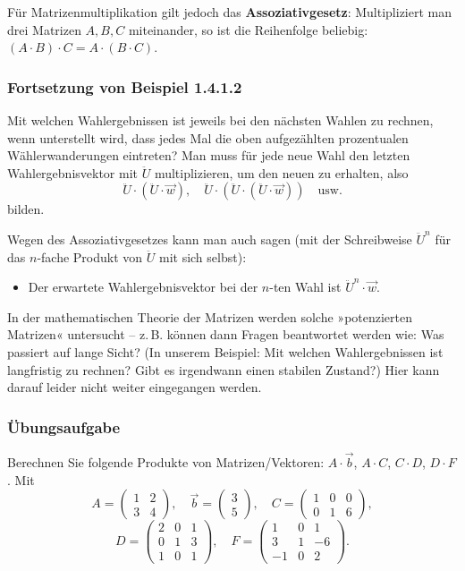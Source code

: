 Für Matrizenmultiplikation gilt jedoch das \textbf{Assoziativgesetz}: Multipliziert man drei Matrizen $A, B, C$ miteinander, so ist die Reihenfolge beliebig: $(A \cdot B) \cdot C = A \cdot (B \cdot C)$.

\subsubsection{Fortsetzung von Beispiel 1.4.1.2}

Mit welchen Wahlergebnissen ist jeweils bei den nächsten Wahlen zu rechnen, wenn unterstellt wird, dass jedes Mal die oben aufgezählten prozentualen Wählerwanderungen eintreten? Man muss für jede neue Wahl den letzten Wahlergebnisvektor mit $\ddot{U}$ multiplizieren, um den neuen zu erhalten, also
\[ \ddot{U} \cdot (\ddot{U} \cdot \vec{w}) , \quad \ddot{U} \cdot (\ddot{U} \cdot (\ddot{U} \cdot \vec{w})) \quad \text{usw.} \]
bilden.

Wegen des Assoziativgesetzes kann man auch sagen (mit der Schreibweise $\ddot{U}^n$ für das $n$-fache Produkt von $\ddot{U}$ mit sich selbst):
\begin{itemize}
  \item Der erwartete Wahlergebnisvektor bei der $n$-ten Wahl ist $\ddot{U}^n \cdot \vec{w}$.
\end{itemize}
In der mathematischen Theorie der Matrizen werden solche »potenzierten Matrizen« untersucht -- z.\,B. können dann Fragen beantwortet werden wie: Was passiert auf lange Sicht? (In unserem Beispiel: Mit welchen Wahlergebnissen ist langfristig zu rechnen? Gibt es irgendwann einen stabilen Zustand?) Hier kann darauf leider nicht weiter eingegangen werden.

\subsubsection{Übungsaufgabe}

\begin{graukasten}
  Berechnen Sie folgende Produkte von Matrizen/Vektoren: $A \cdot \vec{b}$, $A \cdot C$, $C \cdot D$, $D \cdot F$. Mit
  \[ A = \begin{pmatrix} 1 & 2 \\ 3 & 4 \end{pmatrix}, \quad \vec{b} = \begin{pmatrix} 3 \\ 5 \end{pmatrix}, \quad C = \begin{pmatrix} 1 & 0 & 0 \\ 0 & 1 & 6 \end{pmatrix}, \]
  \[ D = \begin{pmatrix} 2 & 0 & 1 \\ 0 & 1 & 3 \\ 1 & 0 & 1 \end{pmatrix}, \quad F = \begin{pmatrix} 1 & 0 & 1 \\ 3 & 1 & -6 \\ -1 & 0 & 2 \end{pmatrix} . \]
\end{graukasten}

